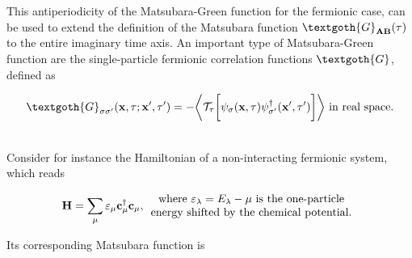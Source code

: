 This antiperiodicity of the Matsubara-Green function for the fermionic case, can be used to extend the definition of the Matsubara function $\textgoth{G}_{{\bf AB}}(\tau)$ to the entire imaginary time axis. An important type of Matsubara-Green function are the single-particle fermionic correlation functions $\textgoth{G}$, defined as 

\begin{equation}
    \begin{split}
        \textgoth{G}_{\sigma \sigma'}({\bf x}, \tau; {\bf x}', \tau') = - \bigg\langle \mathcal{T}_{\tau} \bigg[\psi_{\sigma}({\bf x}, \tau) \psi^\dagger_{\sigma'}({\bf x}', \tau')\bigg] \bigg\rangle \textnormal{ in real space}.
 \end{split}
 \end{equation}
 
\blanky \\

Consider for instance the Hamiltonian of a non-interacting fermionic system, which reads 

\begin{equation}
    {\bf H} = \sum_{\mu} \varepsilon_{\mu} {\bf c}_{\mu}^\dagger {\bf c}_{\mu}, 
\begin{array}{cc}
    \textnormal{ where $\varepsilon_{\lambda} = E_{\lambda} - \mu$ is the one-particle } \\
    \textnormal{energy shifted by the chemical potential.}
\end{array}
\end{equation}

Its corresponding Matsubara function is 

